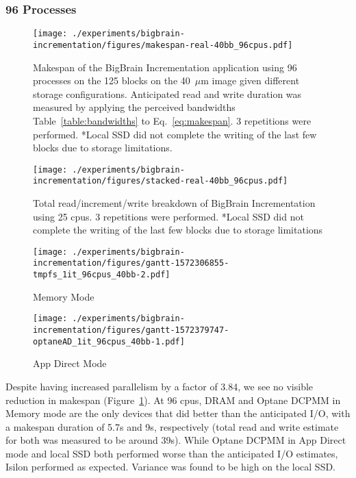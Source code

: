 \documentclass[conference]{IEEEtran}
\newcommand{\bigbrain}{BigBrain\xspace}
\begin{document}
\subsubsection{96 Processes}
\begin{figure}
    \texttt{[image: ./experiments/bigbrain-incrementation/figures/makespan-real-40bb\_96cpus.pdf]}
    \captionsetup{belowskip=-10pt}
    \caption{Makespan of the \bigbrain Incrementation application using 96 
             processes on the 125 blocks on the 40~$\mu$m image given different
             storage configurations. Anticipated read and write duration was 
             measured by applying the perceived bandwidths Table~\ref{table:bandwidths}
             to Eq.~\ref{eq:makespan}. 3 
             repetitions were performed. *Local SSD did not complete the
    writing of the last few blocks due to storage limitations.}\label{fig:makespan-96cpus}
\end{figure}
\begin{figure}
    \texttt{[image: ./experiments/bigbrain-incrementation/figures/stacked-real-40bb\_96cpus.pdf]}
    \captionsetup{belowskip=-10pt}
    \caption{Total read/increment/write breakdown of \bigbrain Incrementation using 25 cpus. 3 repetitions were performed. *Local SSD did not
             complete the writing of the last few blocks due to storage limitations}\label{fig:stacked-96cpus}
\end{figure}

\begin{figure*}
    \begin{subfigure}{\columnwidth}
        \centering
    \texttt{[image: ./experiments/bigbrain-incrementation/figures/gantt-1572306855-tmpfs\_1it\_96cpus\_40bb-2.pdf]}
    \caption{Memory Mode}
\end{subfigure}
\begin{subfigure}{\columnwidth}
        \centering
    \texttt{[image: ./experiments/bigbrain-incrementation/figures/gantt-1572379747-optaneAD\_1it\_96cpus\_40bb-1.pdf]}
    \caption{App Direct Mode}
\end{subfigure}
    \captionsetup{belowskip=-10pt}
\caption{Gantt charts for Optane DCPMM processing 125 blocks of the 40$\mu$m BigBrain using 96 processes}\label{fig:gantt96}
\end{figure*}

Despite having increased parallelism by a factor of 3.84, we see no visible reduction
in makespan (Figure~\ref{fig:makespan-96cpus}). At 96 cpus, DRAM and Optane DCPMM in Memory mode are the only devices that did better than the anticipated I/O, with a makespan duration of
5.7s and 9s, respectively (total read and write estimate for both was measured to be around 39s). While
Optane DCPMM in App Direct mode and local SSD both performed worse than the anticipated I/O estimates, Isilon
performed as expected. Variance was found to be high on the local SSD.
\end{document}
